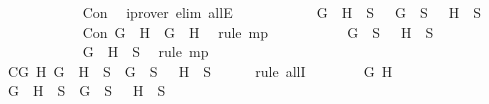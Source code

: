 \begin{isabellebody}
\ \ \ \ \ \ \ \ \ \ \isamarkupfalse%
\ Con\ \isamarkupfalse%
\ {\isacharparenleft}iprover\ elim{\isacharcolon}\ allE{\isacharparenright}\isanewline
\ \ \ \ \ \ \ \ \isamarkupfalse%
\ \isamarkupfalse%
\ {\isachardoublequoteopen}\isactrlbold {\isasymnot}{\isacharparenleft}G\ \isactrlbold {\isasymor}\ H{\isacharparenright}\ {\isasymin}\ S\ {\isasymlongrightarrow}\ \isactrlbold {\isasymnot}\ G\ {\isasymin}\ S\ {\isasymand}\ \isactrlbold {\isasymnot}\ H\ {\isasymin}\ S{\isachardoublequoteclose}\isanewline
\ \ \ \ \ \ \ \ \ \ \isamarkupfalse%
\ {\isacartoucheopen}Con\ {\isacharparenleft}\isactrlbold {\isasymnot}{\isacharparenleft}G\ \isactrlbold {\isasymor}\ H{\isacharparenright}{\isacharparenright}\ {\isacharparenleft}\isactrlbold {\isasymnot}\ G{\isacharparenright}\ {\isacharparenleft}\isactrlbold {\isasymnot}\ H{\isacharparenright}{\isacartoucheclose}\ \isamarkupfalse%
\ {\isacharparenleft}rule\ mp{\isacharparenright}\isanewline
\ \ \ \ \ \ \ \ \isamarkupfalse%
\ {\isachardoublequoteopen}\isactrlbold {\isasymnot}\ G\ {\isasymin}\ S\ {\isasymand}\ \isactrlbold {\isasymnot}\ H\ {\isasymin}\ S{\isachardoublequoteclose}\isanewline
\ \ \ \ \ \ \ \ \ \ \isamarkupfalse%
\ {\isacartoucheopen}\isactrlbold {\isasymnot}{\isacharparenleft}G\ \isactrlbold {\isasymor}\ H{\isacharparenright}\ {\isasymin}\ S{\isacartoucheclose}\ \isamarkupfalse%
\ {\isacharparenleft}rule\ mp{\isacharparenright}\isanewline
\ \ \ \ \ \ \isamarkupfalse%
\isanewline
\ \ \ \ \isamarkupfalse%
\isanewline
\ \ \ \ \isamarkupfalse%
\ C{}{\isacharcolon}{\isachardoublequoteopen}{\isasymforall}G\ H{\isachardot}\ \isactrlbold {\isasymnot}{\isacharparenleft}G\ \isactrlbold {\isasymrightarrow}\ H{\isacharparenright}\ {\isasymin}\ S\ {\isasymlongrightarrow}\ G\ {\isasymin}\ S\ {\isasymand}\ \isactrlbold {\isasymnot}\ H\ {\isasymin}\ S{\isachardoublequoteclose}\isanewline
\ \ \ \ \isamarkupfalse%
\ {\isacharparenleft}rule\ allI{\isacharparenright}{\isacharplus}\isanewline
\ \ \ \ \ \ \isamarkupfalse%
\ G\ H\isanewline
\ \ \ \ \ \ \isamarkupfalse%
\ {\isachardoublequoteopen}\isactrlbold {\isasymnot}{\isacharparenleft}G\ \isactrlbold {\isasymrightarrow}\ H{\isacharparenright}\ {\isasymin}\ S\ {\isasymlongrightarrow}\ G\ {\isasymin}\ S\ {\isasymand}\ \isactrlbold {\isasymnot}\ H\ {\isasymin}\ S{\isachardoublequoteclose}\isanewline
\ \ \ \ \ \ \isamarkupfalse%

\end{isabellebody}

